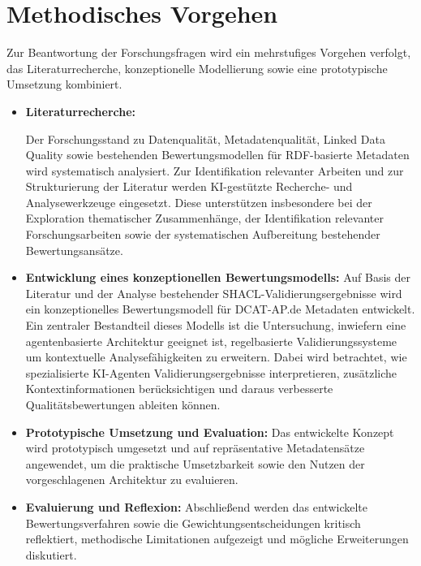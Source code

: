 \chapter{Methodisches Vorgehen}

Zur Beantwortung der Forschungsfragen wird ein mehrstufiges Vorgehen verfolgt, das Literaturrecherche, konzeptionelle Modellierung sowie eine prototypische Umsetzung kombiniert.

\begin{itemize}


\item \textbf{Literaturrecherche:} 

Der Forschungsstand zu Datenqualität, Metadatenqualität, Linked Data Quality sowie bestehenden Bewertungsmodellen für RDF-basierte Metadaten wird systematisch analysiert. Zur Identifikation relevanter Arbeiten und zur Strukturierung der Literatur werden KI-gestützte Recherche- und Analysewerkzeuge eingesetzt. Diese unterstützen insbesondere bei der Exploration thematischer Zusammenhänge, der Identifikation relevanter Forschungsarbeiten sowie der systematischen Aufbereitung bestehender Bewertungsansätze.

\item \textbf{Entwicklung eines konzeptionellen Bewertungsmodells:}  
Auf Basis der Literatur und der Analyse bestehender SHACL-Validierungsergebnisse wird ein konzeptionelles Bewertungsmodell für DCAT-AP.de Metadaten entwickelt. Ein zentraler Bestandteil dieses Modells ist die Untersuchung, inwiefern eine agentenbasierte Architektur geeignet ist, regelbasierte Validierungssysteme um kontextuelle Analysefähigkeiten zu erweitern. Dabei wird betrachtet, wie spezialisierte KI-Agenten Validierungsergebnisse interpretieren, zusätzliche Kontextinformationen berücksichtigen und daraus verbesserte Qualitätsbewertungen ableiten können.

\item \textbf{Prototypische Umsetzung und Evaluation:}  
Das entwickelte Konzept wird prototypisch umgesetzt und auf repräsentative Metadatensätze angewendet, um die praktische Umsetzbarkeit sowie den Nutzen der vorgeschlagenen Architektur zu evaluieren.

\item \textbf{Evaluierung und Reflexion:} Abschließend werden das entwickelte Bewertungsverfahren sowie die Gewichtungsentscheidungen kritisch reflektiert, methodische Limitationen aufgezeigt und mögliche Erweiterungen diskutiert.
\end{itemize}

